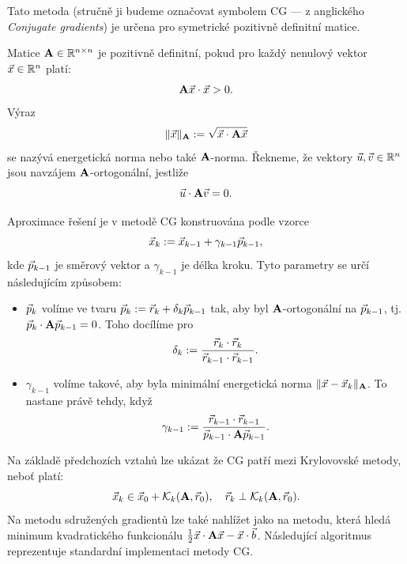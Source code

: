 Tato metoda (stručně ji budeme označovat symbolem CG --- z anglického \emph{Conjugate gradients}) je určena pro symetrické pozitivně definitní matice.
\begin{df}
Matice $\mathbf{A}\in\mathbb R^{n\times n}$ je pozitivně definitní, pokud pro každý nenulový vektor $\vec{x}\in\mathbb R^n$ platí:
$$ \mathbf{A}\vec{x}\cdot\vec{x}>0. $$
Výraz
$$ \|\vec{x}\|_{\mathbf{A}}:=\sqrt{\vec{x}\cdot\mathbf{A}\vec{x}} $$
se nazývá energetická norma nebo také $\mathbf{A}$-norma.
Řekneme, že vektory $\vec{u},\vec{v}\in\mathbb R^n$ jsou navzájem $\mathbf{A}$-ortogonální, jestliže
$$ \vec{u}\cdot\mathbf{A}\vec{v}=0. $$
\end{df}
Aproximace řešení je v metodě CG konstruována podle vzorce
$$ \vec{x}_k:=\vec{x}_{k-1}+\gamma_{k-1}\vec{p}_{k-1}, $$
kde $\vec{p}_{k-1}$ je směrový vektor a $\gamma_{k-1}$ je délka kroku.
Tyto parametry se určí následujícím způsobem:
\begin{itemize}
\item $\vec{p}_k$ volíme ve tvaru $\vec{p}_k:=\vec{r}_k+\delta_k\vec{p}_{k-1}$ tak, aby byl $\mathbf{A}$-ortogonální na $\vec{p}_{k-1}$, tj. $\vec{p}_k\cdot\mathbf{A}\vec{p}_{k-1}=0$. Toho docílíme pro
$$ \delta_k:=\frac{\vec{r}_k\cdot\vec{r}_k}{\vec{r}_{k-1}\cdot\vec{r}_{k-1}}. $$
\item $\gamma_{k-1}$ volíme takové, aby byla minimální energetická norma $\|\vec{x}-\vec{x}_k\|_{\mathbf{A}}$. To nastane právě tehdy, když
$$ \gamma_{k-1}:=\frac{\vec{r}_{k-1}\cdot\vec{r}_{k-1}}{\vec{p}_{k-1}\cdot\mathbf{A}\vec{p}_{k-1}}. $$
\end{itemize}
Na základě předchozích vztahů lze ukázat že CG patří mezi Krylovovské metody, neboť platí:
$$ \vec{x}_k\in\vec{x}_0+\mathcal K_k(\mathbf{A},\vec{r}_0),\quad \vec{r}_k\perp\mathcal K_k(\mathbf{A},\vec{r}_0). $$
Na metodu sdružených gradientů lze také nahlížet jako na metodu, která hledá mi\-ni\-mum kvadratického funkcionálu $\frac12\vec{x}\cdot\mathbf{A}\vec{x}-\vec{x}\cdot\vec{b}$.
Následující algoritmus reprezentuje standardní implementaci metody CG.


